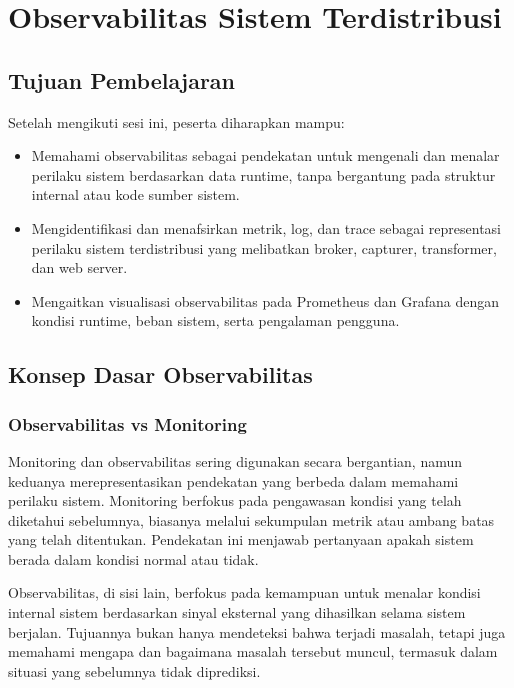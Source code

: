 \chapter{Observabilitas Sistem Terdistribusi}

\section{Tujuan Pembelajaran}

Setelah mengikuti sesi ini, peserta diharapkan mampu:
\begin{itemize}
  \item Memahami observabilitas sebagai pendekatan untuk mengenali dan menalar perilaku sistem berdasarkan data runtime, tanpa bergantung pada struktur internal atau kode sumber sistem.
  \item Mengidentifikasi dan menafsirkan metrik, log, dan trace sebagai representasi perilaku sistem terdistribusi yang melibatkan broker, capturer, transformer, dan web server.
  \item Mengaitkan visualisasi observabilitas pada Prometheus dan Grafana dengan kondisi runtime, beban sistem, serta pengalaman pengguna.
\end{itemize}


\section{Konsep Dasar Observabilitas}

\subsection{Observabilitas vs Monitoring}

Monitoring dan observabilitas sering digunakan secara bergantian, namun keduanya merepresentasikan pendekatan yang berbeda dalam memahami perilaku sistem. Monitoring berfokus pada pengawasan kondisi yang telah diketahui sebelumnya, biasanya melalui sekumpulan metrik atau ambang batas yang telah ditentukan. Pendekatan ini menjawab pertanyaan apakah sistem berada dalam kondisi normal atau tidak.

Observabilitas, di sisi lain, berfokus pada kemampuan untuk menalar kondisi internal sistem berdasarkan sinyal eksternal yang dihasilkan selama sistem berjalan. Tujuannya bukan hanya mendeteksi bahwa terjadi masalah, tetapi juga memahami mengapa dan bagaimana masalah tersebut muncul, termasuk dalam situasi yang sebelumnya tidak diprediksi.


